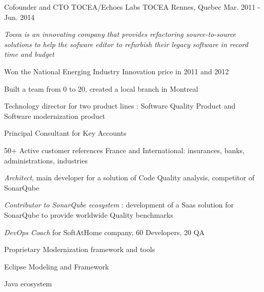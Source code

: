 \begin{cventries}
    \cventry
    {Cofounder and CTO TOCEA/Echoes Labs} %
    {TOCEA} %
    {Rennes, Quebec} %
    {Mar. 2011 - Jun. 2014} %
    {
        \experience
            {
                \begin{cvitems} %
                    \item{\emph{Tocea is an innovating company that provides refactoring source-to-source solutions to help the sofware editor to refurbish their legacy software in record time and budget}}
                    \item{Won the National Energing Industry Innovation price in 2011 and 2012}
                    \item{Built a team from 0 to 20, created a local branch in Montreal}
                    \item{Technology director for two product lines : Software Quality Product and Software modernization product}
                    \item{Principal Consultant for Key Accounts}
                    \item{50+ Active customer references France and International: insurances, banks, administrations, industries}
                \end{cvitems}
            }
            {
               \begin{cvitems} %
                \item {\emph{Architect}, main developer for a solution of Code Quality analysis, competitor of SonarQube }
                \item {\emph{Contributor to SonarQube ecosystem} : development of a Saas solution for SonarQube to provide worldwide Quality benchmarks}
                \item{\emph{DevOps Coach} for SoftAtHome company, 60 Developers, 20 QA}
               \end{cvitems}
            }
            {
                \begin{cvitems} %
                    \item{Proprietary Modernization framework and tools}
                    \item{Eclipse Modeling and Framework}
                    \item{Java ecosystem}
                \end{cvitems}
            }            
    }


\end{cventries}
